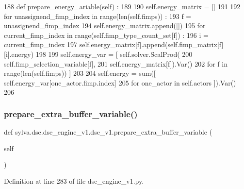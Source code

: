 \begin{DoxyCode}
188   \textcolor{keyword}{def }prepare\_energy\_ariable(self) :
189 
190     self.energy\_matrix = []
191 
192     \textcolor{keywordflow}{for} unassignend\_fimp\_index \textcolor{keywordflow}{in} range(len(self.fimps)) :
193       f = unassignend\_fimp\_index
194       self.energy\_matrix.append([])
195       \textcolor{keywordflow}{for} current\_fimp\_index \textcolor{keywordflow}{in} range(self.fimp\_type\_count\_set[f]) :
196         i = current\_fimp\_index
197         self.energy\_matrix[f].append(self.fimp\_matrix[f][i].energy)
198 
199     self.energy\_var = [ self.solver.ScalProd(
200                           self.fimp\_selection\_variable[f],
201                           self.energy\_matrix[f]).Var()
202                         \textcolor{keywordflow}{for} f \textcolor{keywordflow}{in} range(len(self.fimps)) ]
203 
204     self.energy = sum([ self.energy\_var[one\_actor.fimp.index]
205                         \textcolor{keywordflow}{for} one\_actor \textcolor{keywordflow}{in} self.actors ]).Var()
206 
\end{DoxyCode}
\mbox{\label{classsylva_1_1dse_1_1dse__engine__v1_1_1dse__v1_ad197bd8cc0b39f0c76e6b255a1255d06}} 
\subsubsection{\texorpdfstring{prepare\+\_\+extra\+\_\+buffer\+\_\+variable()}{prepare\_extra\_buffer\_variable()}}
{\footnotesize\ttfamily def sylva.\+dse.\+dse\+\_\+engine\+\_\+v1.\+dse\+\_\+v1.\+prepare\+\_\+extra\+\_\+buffer\+\_\+variable (\begin{DoxyParamCaption}\item[{}]{self }\end{DoxyParamCaption})}



Definition at line 283 of file dse\+\_\+engine\+\_\+v1.\+py.


